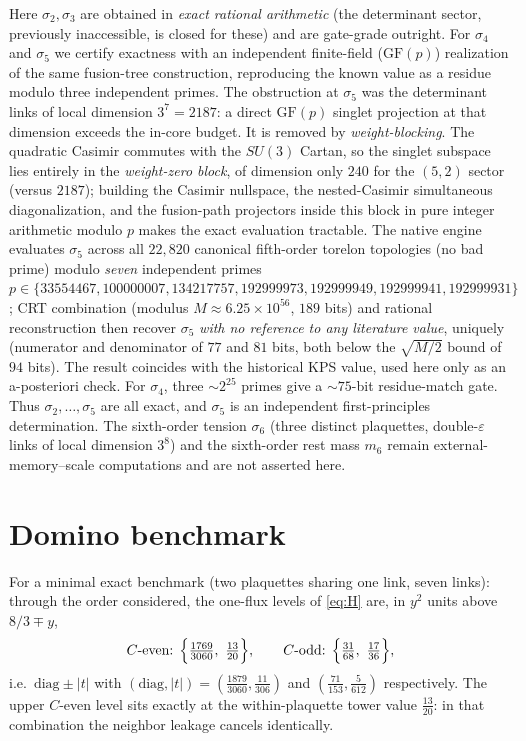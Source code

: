 \documentclass[11pt]{article}
\begin{document}
Here $\sigma_2,\sigma_3$ are obtained in \emph{exact rational arithmetic} (the
determinant sector, previously inaccessible, is closed for these) and are gate-grade outright.
For $\sigma_4$ and $\sigma_5$ we certify exactness with an independent finite-field
($\mathrm{GF}(p)$) realization of the same fusion-tree construction, reproducing the known
value as a residue modulo three independent primes. The obstruction at $\sigma_5$ was the
determinant links of local dimension $3^7=2187$: a direct $\mathrm{GF}(p)$ singlet projection
at that dimension exceeds the in-core budget. It is removed by \emph{weight-blocking}. The
quadratic Casimir commutes with the $SU(3)$ Cartan, so the singlet subspace lies entirely in
the \emph{weight-zero block}, of dimension only $240$ for the $(5,2)$ sector (versus $2187$);
building the Casimir nullspace, the nested-Casimir simultaneous diagonalization, and the
fusion-path projectors inside this block in pure integer arithmetic modulo $p$ makes the exact
evaluation tractable. The native engine evaluates $\sigma_5$ across all $22{,}820$ canonical fifth-order torelon
topologies (no bad prime) modulo \emph{seven} independent primes
$p\in\{33554467,100000007,134217757,192999973,192999949,192999941,192999931\}$; CRT
combination (modulus $M\approx6.25\times10^{56}$, $189$ bits) and rational reconstruction then
recover $\sigma_5$ \emph{with no reference to any literature value}, uniquely (numerator and
denominator of $77$ and $81$ bits, both below the $\sqrt{M/2}$ bound of $94$ bits). The result
coincides with the historical KPS value, used here only as an a-posteriori check. For $\sigma_4$,
three $\sim\!2^{25}$ primes give a $\sim\!75$-bit residue-match gate. Thus $\sigma_2,\dots,\sigma_5$
are all exact, and $\sigma_5$ is an independent first-principles determination. The sixth-order
tension $\sigma_6$ (three distinct plaquettes, double-$\varepsilon$ links of local dimension
$3^8$) and the sixth-order rest mass $m_6$ remain external-memory--scale computations and are
not asserted here.

\section{Domino benchmark}
\label{app:domino}

For a minimal exact benchmark (two plaquettes sharing one link, seven
links): through the order considered, the one-flux levels of \eqref{eq:H}
are, in $y^2$ units above $8/3\mp y$,
\begin{equation}
C\text{-even: }\Bigl\{\tfrac{1769}{3060},\ \tfrac{13}{20}\Bigr\},
\qquad
C\text{-odd: }\Bigl\{\tfrac{31}{68},\ \tfrac{17}{36}\Bigr\},
\end{equation}
i.e.\ $\mathrm{diag}\pm|t|$ with
$(\mathrm{diag},|t|)=(\tfrac{1879}{3060},\tfrac{11}{306})$ and
$(\tfrac{71}{153},\tfrac{5}{612})$ respectively. The upper $C$-even level
sits exactly at the within-plaquette tower value $\tfrac{13}{20}$: in that
combination the neighbor leakage cancels identically.
\end{document}
